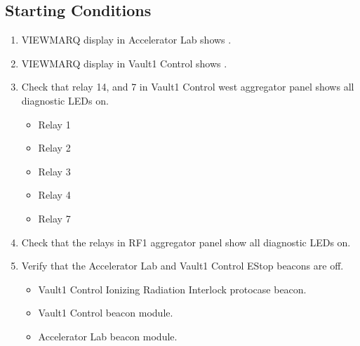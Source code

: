 \documentclass[letterpaper,10pt,english]{sphinxmanual}
\begin{document}
\subsection{Starting Conditions}
\label{\detokenize{testing_documentation/e-stop_testing:starting-conditions}}\begin{enumerate}
%
\item {} 
\sphinxAtStartPar
VIEWMARQ display in Accelerator Lab shows .

\item {} 
\sphinxAtStartPar
VIEWMARQ display in Vault\sphinxhyphen{}1 Control shows .

\item {} 
\sphinxAtStartPar
Check that relay 1\sphinxhyphen{}4, and 7 in Vault\sphinxhyphen{}1 Control west aggregator panel shows all diagnostic LEDs on.
\begin{itemize}
\item {} 
\sphinxAtStartPar
Relay 1

\item {} 
\sphinxAtStartPar
Relay 2

\item {} 
\sphinxAtStartPar
Relay 3

\item {} 
\sphinxAtStartPar
Relay 4

\item {} 
\sphinxAtStartPar
Relay 7

\end{itemize}

\item {} 
\sphinxAtStartPar
Check that the relays in RF\sphinxhyphen{}1 aggregator panel show all diagnostic LEDs on.

\item {} 
\sphinxAtStartPar
Verify that the Accelerator Lab and Vault\sphinxhyphen{}1 Control E\sphinxhyphen{}Stop beacons are off.
\begin{itemize}
\item {} 
\sphinxAtStartPar
Vault\sphinxhyphen{}1 Control Ionizing Radiation Interlock protocase beacon.

\item {} 
\sphinxAtStartPar
Vault\sphinxhyphen{}1 Control  beacon module.

\item {} 
\sphinxAtStartPar
Accelerator Lab  beacon module.


\end{itemize}
\end{enumerate}
\end{document}
